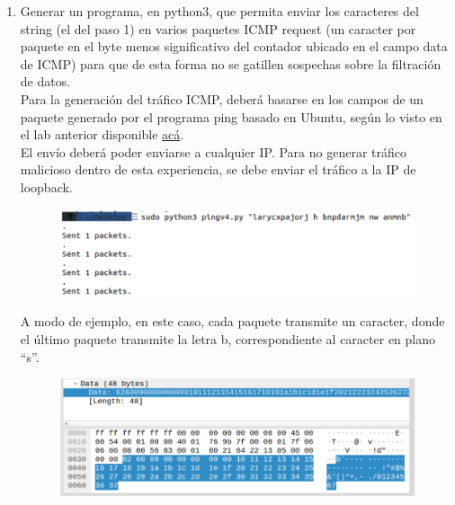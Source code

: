 \documentclass[letter,12pt]{article}
\begin{document}
\begin{enumerate}
    \item Generar un programa, en python3, que permita enviar los caracteres del string (el del paso 1) en varios paquetes ICMP request (un caracter por paquete en el byte menos significativo del contador ubicado en el campo data de ICMP) para que de esta forma no se gatillen sospechas sobre la filtración de datos.\\
    Para la generación del tráfico ICMP, deberá basarse en los campos de un paquete generado por el programa ping basado en Ubuntu, según lo visto en el lab anterior disponible \href{https://www.cloudshark.org/captures/d5b420cd47de}{acá}.\\
    El envío deberá poder enviarse a cualquier IP. Para no generar tráfico malicioso dentro de esta experiencia, se debe enviar el tráfico a la IP de loopback.\\
    \begin{figure}[H]
        \centering
        \includegraphics[width=15cm]{actividades/A2.1.png}
        \label{fig:a2-1}
    \end{figure}
    A modo de ejemplo, en este caso, cada paquete transmite un caracter, donde el último paquete transmite la letra b, correspondiente al caracter en plano \textquotedblleft s\textquotedblright.
    \begin{figure}[H]
            \centering
            \includegraphics[width=15cm]{actividades/A2.2.png}
            \label{fig:a2-2}
        \end{figure}
\end{enumerate}

\clearpage
\end{document}
